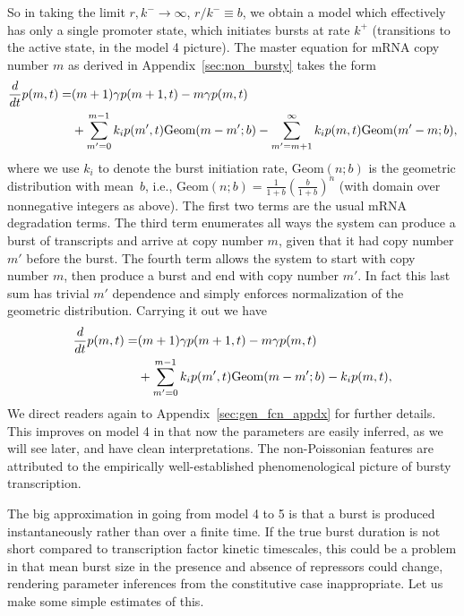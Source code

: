 So in taking the limit $r,k^-\rightarrow\infty$, $r/k^-\equiv b$, we obtain a
model which effectively has only a single promoter state, which initiates bursts
at rate $k^+$ (transitions to the active state, in the model 4 picture). The
master equation for mRNA copy number $m$ as derived in
Appendix~\ref{sec:non_bursty} takes the form
\begin{align}
\begin{split}
{d \over dt}p(m,t) = & (m+1)\gamma p(m+1,t) - m\gamma p(m,t) \\
        &+ \sum_{m'=0}^{m-1} k_i p(m',t) \text{Geom}(m-m';b)
         - \sum_{m'=m+1}^\infty k_i p(m,t) \text{Geom}(m'-m;b),
\end{split}
\end{align}
where we use $k_i$ to denote the burst initiation rate, $\text{Geom}(n;b)$ is
the geometric distribution with mean~$b$, i.e., $\text{Geom}(n;b) =
\frac{1}{1+b}\left(\frac{b}{1+b}\right)^n$ (with domain over nonnegative
integers as above). The first two terms are the usual mRNA degradation terms.
The third term enumerates all ways the system can produce a burst of transcripts
and arrive at copy number $m$, given that it had copy number $m'$ before the
burst. The fourth term allows the system to start with copy number $m$, then
produce a burst and end with copy number $m'$. In fact this last sum has trivial
$m'$ dependence and simply enforces normalization of the geometric distribution.
Carrying it out we have
\begin{equation}
\begin{split}
{d \over dt} p(m,t) = & (m+1)\gamma p(m+1,t) - m\gamma p(m,t) \\
        &+ \sum_{m'=0}^{m-1} k_i p(m',t) \text{Geom}(m-m';b)
            - k_i p(m,t),
\end{split}
\end{equation}
We direct readers again to Appendix~\ref{sec:gen_fcn_appdx} for further details.
This improves on model 4 in that now the parameters are easily inferred, as we
will see later, and have clean interpretations. The non-Poissonian features are
attributed to the empirically well-established phenomenological picture of
bursty transcription.

The big approximation in going from model 4 to 5 is that a burst is produced
instantaneously rather than over a finite time. If the true burst duration is
not short compared to transcription factor kinetic timescales, this could be a
problem in that mean burst size in the presence and absence of repressors could
change, rendering parameter inferences from the constitutive case inappropriate.
Let us make some simple estimates of this.

